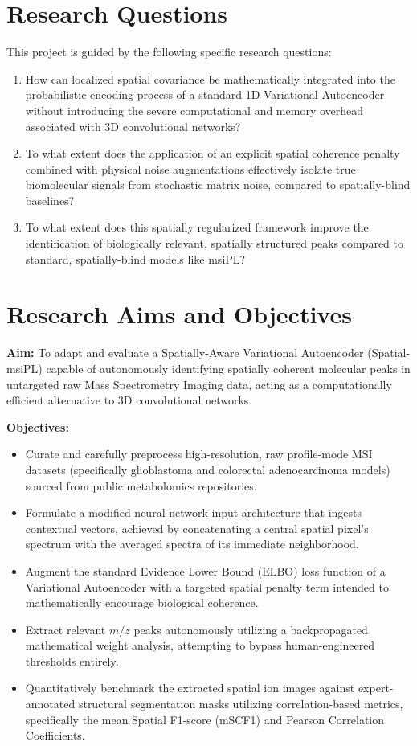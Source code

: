 \documentclass[
12pt, %
oneside, %
english, %
onehalfspacing, %
nolistspacing, %
headsepline, %
]{MastersDoctoralThesis} %
\begin{document}
\section{Research Questions}
This project is guided by the following specific research questions:
\begin{enumerate}
    \item How can localized spatial covariance be mathematically integrated into the probabilistic encoding process of a standard 1D Variational Autoencoder without introducing the severe computational and memory overhead associated with 3D convolutional networks? 
    \item To what extent does the application of an explicit spatial coherence penalty combined with physical noise augmentations effectively isolate true biomolecular signals from stochastic matrix noise, compared to spatially-blind baselines? 
    \item To what extent does this spatially regularized framework improve the identification of biologically relevant, spatially structured peaks compared to standard, spatially-blind models like msiPL? 
\end{enumerate}

\section{Research Aims and Objectives}
\textbf{Aim:} To adapt and evaluate a Spatially-Aware Variational Autoencoder (Spatial-msiPL) capable of autonomously identifying spatially coherent molecular peaks in untargeted raw Mass Spectrometry Imaging data, acting as a computationally efficient alternative to 3D convolutional networks.

\textbf{Objectives:}
\begin{itemize}
    \item Curate and carefully preprocess high-resolution, raw profile-mode MSI datasets (specifically glioblastoma and colorectal adenocarcinoma models) sourced from public metabolomics repositories.~\citep{abdelmoula2022massnet}
    \item Formulate a modified neural network input architecture that ingests contextual vectors, achieved by concatenating a central spatial pixel's spectrum with the averaged spectra of its immediate neighborhood.
    \item Augment the standard Evidence Lower Bound (ELBO) loss function of a Variational Autoencoder with a targeted spatial penalty term intended to mathematically encourage biological coherence.
    \item Extract relevant $m/z$ peaks autonomously utilizing a backpropagated mathematical weight analysis, attempting to bypass human-engineered thresholds entirely.
    \item Quantitatively benchmark the extracted spatial ion images against expert-annotated structural segmentation masks utilizing correlation-based metrics, specifically the mean Spatial F1-score (mSCF1) and Pearson Correlation Coefficients.
\end{itemize}
\end{document}

